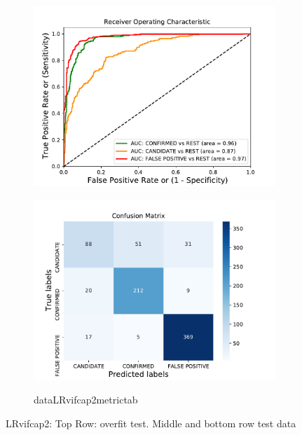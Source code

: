 \begin{figure}[H]
\begin{subfigure}{.49\textwidth}
                \includegraphics[width = 1\textwidth]{data/LR_vif_cap2_roc.pdf}
                \end{subfigure}
                \begin{subfigure}{.49\textwidth}
                \includegraphics[width = 1\textwidth]{data/LR_vif_cap2_cm.pdf}
                \end{subfigure}
                \begin{subfigure}{1\textwidth}
                \csname dataLRvifcap2metrictab\endcsname
                \end{subfigure}
                \caption{LRvifcap2: Top Row: overfit test. Middle and bottom row test data}
                \label{fig:data/LR_vif_cap2_roc}
                \end{figure}